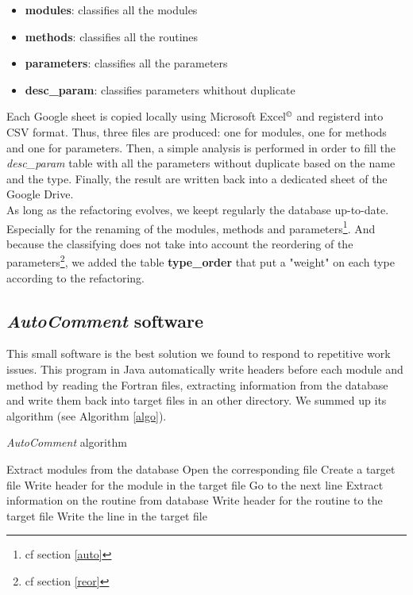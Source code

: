 \begin{itemize}
\item \textbf{modules}: classifies all the modules
\item \textbf{methods}: classifies all the routines
\item \textbf{parameters}: classifies all the parameters
\item \textbf{desc\_param}: classifies parameters whithout duplicate
\end{itemize}
Each Google sheet is copied locally using Microsoft Excel$^\copyright$ and registerd into CSV format. Thus, three files are produced: one for modules, one for methods and one for parameters. Then, a simple analysis is performed in order to fill the \textit{desc\_param} table with all the parameters without duplicate based on the name and the type. Finally, the result are written back into a dedicated sheet of the Google Drive.\\

As long as the refactoring evolves, we keept regularly the database up-to-date. Especially for the renaming of the modules, methods and parameters\footnote{cf section \ref{auto}}. And because the classifying does not take into account the reordering of the parameters\footnote{cf section \ref{reor}}, we added the table \textbf{type\_order} that put a "weight" on each type according to the refactoring.

\subsection{\textit{AutoComment} software\label{auto}}
This small software is the best solution we found to respond to repetitive work issues. This program in Java automatically write headers before each module and method by reading the Fortran files, extracting information from the database and write them back into target files in an other directory. We summed up its algorithm (see Algorithm \ref{algo}). 
\begin{algorithm}
\caption{\textit{AutoComment} algorithm}
\label{algo}
\begin{algorithmic}
\State Extract modules from the database
\State Open the corresponding file
\State Create a target file
\State Write header for the module in the target file
			\State Go to the next line
			\State Extract information on the routine from database
			\State Write header for the routine to the target file
		\Else
			\State Write the line in the target file
		\EndIf
	\EndFor
\EndFor
\end{algorithmic}
\end{algorithm}

